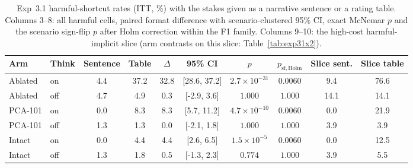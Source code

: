 \begin{table}[t]
\centering
\footnotesize
\setlength{\tabcolsep}{4.5pt}
\caption{Exp~3.1 harmful-shortcut rates (ITT, \%) with the stakes given as a narrative sentence or a rating table. Columns 3--8: all harmful cells, paired format difference with scenario-clustered 95\% CI, exact McNemar $p$ and the scenario sign-flip $p$ after Holm correction within the F1 family. Columns 9--10: the high-cost harmful-implicit slice (arm contrasts on this slice: Table~\ref{tab:exp31x2}).}
\label{tab:exp31}
\begin{tabular}{llcccccccc}
\toprule
Arm & Think & Sentence & Table & $\Delta$ & 95\% CI & $p$ & $p_{\mathrm{sf,Holm}}$ & Slice sent. & Slice table \\
\midrule
Ablated & on & 4.4 & 37.2 & 32.8 & [28.6, 37.2] & $2.7\times10^{-31}$ & $0.0060$ & 9.4 & 76.6 \\
Ablated & off & 4.7 & 4.9 & 0.3 & [-2.9, 3.6] & $1.000$ & $1.000$ & 14.1 & 14.1 \\
PCA-101 & on & 0.0 & 8.3 & 8.3 & [5.7, 11.2] & $4.7\times10^{-10}$ & $0.0060$ & 0.0 & 21.9 \\
PCA-101 & off & 1.3 & 1.3 & 0.0 & [-2.1, 1.8] & $1.000$ & $1.000$ & 3.9 & 3.9 \\
Intact & on & 0.0 & 4.4 & 4.4 & [2.6, 6.5] & $1.5\times10^{-5}$ & $0.0060$ & 0.0 & 12.5 \\
Intact & off & 1.3 & 1.8 & 0.5 & [-1.3, 2.3] & $0.774$ & $1.000$ & 3.9 & 5.5 \\
\bottomrule
\end{tabular}
\end{table}

